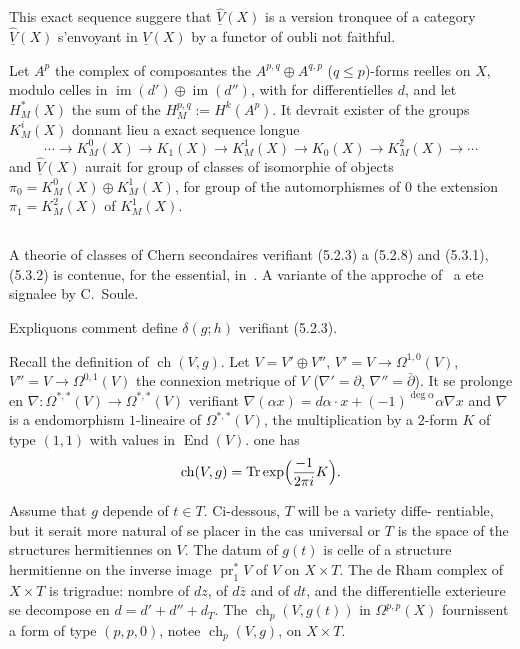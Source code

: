 \documentclass[12pt,a4paper]{article}
\theoremstyle{plain}
\theoremstyle{definition}
\DeclareMathOperator{\Tr}{Tr}
\DeclareMathOperator{\ch}{ch}
\DeclareMathOperator{\End}{End}
\DeclareMathOperator{\im}{im}
\DeclareMathOperator{\pr}{pr}
\begin{document}
This exact sequence suggere that $\widehat{\underline{V}}(X)$ is a version tronquee of a category
$\underline{\widehat{V}}(X)$ s'envoyant in $\underline{V}(X)$ by a functor of oubli not faithful.

Let $A^p$ the complex of composantes the $A^{p,q} \oplus A^{q,p}$ ($q \leq p$)-forms reelles
on $X$, modulo celles in $\im(d') \oplus \im(d'')$, with for differentielles $d$, and let
$H^*_M(X)$ the sum of the $H^{p,q}_M := H^k(A^p)$. It devrait exister of the groups $K_M^i(X)$
donnant lieu a exact sequence longue
\begin{equation}\label{eq:5.4.2}
\cdots \to K_M^0(X) \to K_1(X) \to K_M^1(X) \to K_0(X) \to K_M^2(X) \to \cdots
\end{equation}
and $\underline{\widehat{V}}(X)$ aurait for group of classes of isomorphie of objects $\pi_0 = K_M^0(X) \oplus K^1_M(X)$,
for group of the automorphismes of $0$ the extension $\pi_1 = K^2_M(X)$ of $K^1_M(X)$.

\subsection{}

A theorie of classes of Chern secondaires verifiant (5.2.3) a (5.2.8) and
(5.3.1), (5.3.2) is contenue, for the essential, in~\cite{4}. A variante of the approche
of~\cite{4} a ete signalee by C.~Soule.

Expliquons comment define $\delta(g; h)$ verifiant (5.2.3).

Recall the definition of $\ch(V, g)$. Let $V = V' \oplus V''$, $V' = V \to \Omega^{1,0}(V)$,
$V'' = V \to \Omega^{0,1}(V)$ the connexion metrique of $V$ ($\nabla' = \partial$, $\nabla'' = \bar\partial$). It se prolonge
en $\nabla: \Omega^{*,*}(V) \to \Omega^{*,*}(V)$ verifiant $\nabla(\alpha x) = d\alpha \cdot x + (-1)^{\deg \alpha} \alpha \nabla x$ and $\nabla$
is a endomorphism $1$-lineaire of $\Omega^{*,*}(V)$, the multiplication by a $2$-form
$K$ of type $(1,1)$ with values in $\End(V)$. one has
\[
\ch(V, g) = \Tr \exp\Bigl(\frac{-1}{2\pi i} K\Bigr) .
\]

Assume that $g$ depende of $t \in T$. Ci-dessous, $T$ will be a variety diffe-
rentiable, but it serait more natural of se placer in the cas universal or
$T$ is the space of the structures hermitiennes on $V$. The datum of $g(t)$ is
celle of a structure hermitienne on the inverse image $\pr_1^* V$ of $V$ on $X \times T$.
The de Rham complex of $X \times T$ is trigradue: nombre of $dz$, of $d\bar{z}$ and
of $dt$, and the differentielle exterieure se decompose en $d = d' + d'' + d_T$.
The $\ch_p(V, g(t))$ in $\Omega^{p,p}(X)$ fournissent a form of type $(p,p,0)$, notee
$\ch_p(V, g)$, on $X \times T$.
\end{document}
